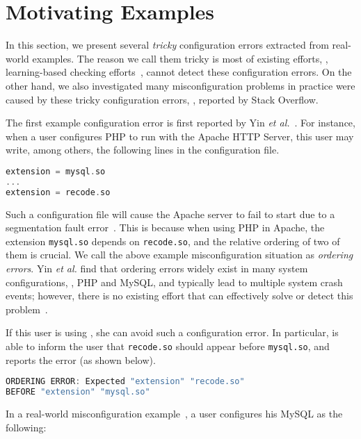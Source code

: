 \section{Motivating Examples}
\label{sec-motiv}

In this section, we present several {\em tricky} configuration errors
extracted from real-world examples. 
The reason we call them tricky is
most of existing efforts, \eg, learning-based checking
efforts~\cite{zhang14encore, wang04automatic}, cannot detect
these configuration errors.
On the other hand, we also investigated 
many misconfiguration problems in practice were caused by 
these tricky configuration errors, \eg, reported by Stack Overflow.

The first example configuration error is first reported by 
Yin {\em et al.}~\cite{yin11anempirical}.
For instance, when a user configures PHP to run with the
Apache HTTP Server, this user may write, among others, 
the following lines in the configuration file.

\begin{lstlisting}[language=C, xleftmargin=.01\textwidth]
extension = mysql.so
...
extension = recode.so
\end{lstlisting} 

Such a configuration file will cause the Apache server to 
fail to start due to a segmentation fault error~\cite{yin11anempirical}. 
This is because when using PHP in Apache, the extension {\tt mysql.so} 
depends on {\tt recode.so}, and the relative ordering of two of them 
is crucial. 
We call the above example misconfiguration situation 
as {\em ordering errors}.
Yin {\em et al.} find that ordering errors widely exist in
many system configurations, \eg, PHP and MySQL,
and typically lead to multiple system crash events;
however, there is no existing effort that can effectively solve 
or detect this problem~\cite{zhang14encore, xu15systems, xu13do}.

If this user is using \app, she can avoid such a configuration error.
In particular, \app is able to inform the user that {\tt recode.so} 
should appear before {\tt mysql.so}, and reports the error (as shown
below).

\begin{lstlisting}[language=C, xleftmargin=.01\textwidth]
ORDERING ERROR: Expected "extension" "recode.so"
BEFORE "extension" "mysql.so"
\end{lstlisting} 

In a real-world misconfiguration example~\cite{correlation}, 
a user configures his MySQL as the following:

